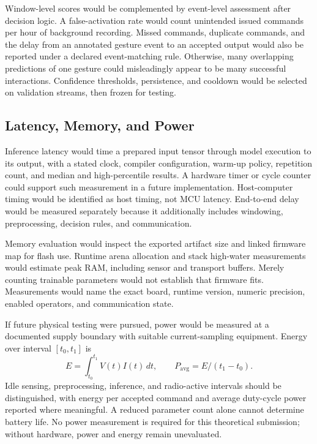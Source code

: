 \documentclass[conference]{IEEEtran}
\begin{document}
Window-level scores would be complemented by event-level assessment after decision logic. A false-activation rate would count unintended issued commands per hour of background recording. Missed commands, duplicate commands, and the delay from an annotated gesture event to an accepted output would also be reported under a declared event-matching rule. Otherwise, many overlapping predictions of one gesture could misleadingly appear to be many successful interactions. Confidence thresholds, persistence, and cooldown would be selected on validation streams, then frozen for testing.

\subsection{Latency, Memory, and Power}
Inference latency would time a prepared input tensor through model execution to its output, with a stated clock, compiler configuration, warm-up policy, repetition count, and median and high-percentile results. A hardware timer or cycle counter could support such measurement in a future implementation. Host-computer timing would be identified as host timing, not MCU latency. End-to-end delay would be measured separately because it additionally includes windowing, preprocessing, decision rules, and communication.

Memory evaluation would inspect the exported artifact size and linked firmware map for flash use. Runtime arena allocation and stack high-water measurements would estimate peak RAM, including sensor and transport buffers. Merely counting trainable parameters would not establish that firmware fits. Measurements would name the exact board, runtime version, numeric precision, enabled operators, and communication state.

If future physical testing were pursued, power would be measured at a documented supply boundary with suitable current-sampling equipment. Energy over interval $[t_0,t_1]$ is
\begin{equation}
E=\int_{t_0}^{t_1} V(t)I(t)\,dt,\qquad
P_{\mathrm{avg}}=E/(t_1-t_0).
\end{equation}
Idle sensing, preprocessing, inference, and radio-active intervals should be distinguished, with energy per accepted command and average duty-cycle power reported where meaningful. A reduced parameter count alone cannot determine battery life. No power measurement is required for this theoretical submission; without hardware, power and energy remain unevaluated.
\end{document}
